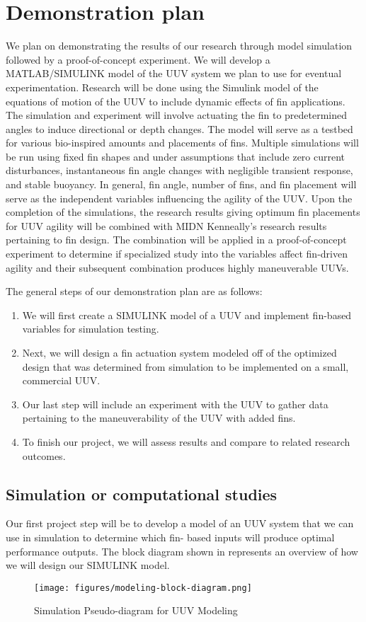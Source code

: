 \documentclass{IEEEtran}
\begin{document}
\section{Demonstration plan}
We plan on demonstrating the results of our research through model simulation followed by a proof-of-concept experiment. We will develop a MATLAB/SIMULINK model of the UUV system we plan to use for eventual experimentation. Research will be done using the Simulink model of the equations of motion of the UUV to include dynamic effects of fin applications. The simulation and experiment will involve actuating the fin to predetermined angles to induce directional or depth changes. The model will serve as a testbed for various bio-inspired amounts and placements of fins. Multiple simulations will be run using fixed fin shapes and under assumptions that include zero current disturbances, instantaneous fin angle changes with negligible transient response, and stable buoyancy. In general, fin angle, number of fins, and fin placement will serve as the independent variables influencing the agility of the UUV. Upon the completion of the simulations, the research results giving optimum fin placements for UUV agility will be combined with MIDN Kenneally’s research results pertaining to fin design. The combination will be applied in a proof-of-concept experiment to determine if specialized study into the variables affect fin-driven agility and their subsequent combination produces highly maneuverable UUVs.

The general steps of our demonstration plan are as follows:
\begin{enumerate}
\item We will first create a SIMULINK model of a UUV and implement fin-based variables for simulation testing.
\item Next, we will design a fin actuation system modeled off of the optimized design that was determined from
simulation to be implemented on a small, commercial UUV.
\item Our last step will include an experiment with the UUV to gather data pertaining to the maneuverability of the
UUV with added fins.
\item To finish our project, we will assess results and compare to related research outcomes.
\end{enumerate}

\subsection{Simulation or computational studies}
Our first project step will be to develop a model of an UUV system that we can use in simulation to determine which fin- based inputs will produce optimal performance outputs. The block diagram shown in  represents an overview of how we will design our SIMULINK model.
\begin{figure*}
\begin{center}
\texttt{[image: figures/modeling-block-diagram.png]}
\end{center}
\caption{Simulation Pseudo-diagram for UUV Modeling}
\label{fig:4}
\end{figure*}
\end{document}
